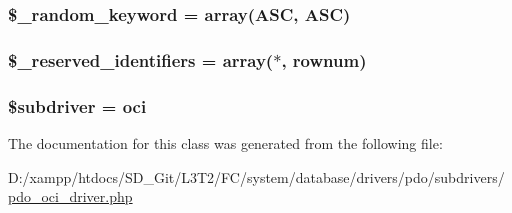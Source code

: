 \subsubsection[{\$\+\_\+random\+\_\+keyword}]{\setlength{\rightskip}{0pt plus 5cm}\$\+\_\+random\+\_\+keyword = array(\textquotesingle{}A\+S\+C\textquotesingle{}, \textquotesingle{}A\+S\+C\textquotesingle{})\hspace{0.3cm}{\ttfamily [protected]}}\label{class_c_i___d_b__pdo__oci__driver_a10213aa6e05f6d924d3277bb1d2fea00}
\hypertarget{class_c_i___d_b__pdo__oci__driver_aa3298c4c62fbee8bb09f1b75b633fb0d}{}
\subsubsection[{\$\+\_\+reserved\+\_\+identifiers}]{\setlength{\rightskip}{0pt plus 5cm}\$\+\_\+reserved\+\_\+identifiers = array(\textquotesingle{}$\ast$\textquotesingle{}, \textquotesingle{}rownum\textquotesingle{})\hspace{0.3cm}{\ttfamily [protected]}}\label{class_c_i___d_b__pdo__oci__driver_aa3298c4c62fbee8bb09f1b75b633fb0d}
\hypertarget{class_c_i___d_b__pdo__oci__driver_a1322ca756348b11d080cb7a4f590de15}{}
\subsubsection[{\$subdriver}]{\setlength{\rightskip}{0pt plus 5cm}\$subdriver = \textquotesingle{}oci\textquotesingle{}}\label{class_c_i___d_b__pdo__oci__driver_a1322ca756348b11d080cb7a4f590de15}


The documentation for this class was generated from the following file\+:\begin{DoxyCompactItemize}
\item 
D\+:/xampp/htdocs/\+S\+D\+\_\+\+Git/\+L3\+T2/\+F\+C/system/database/drivers/pdo/subdrivers/\hyperlink{pdo__oci__driver_8php}{pdo\+\_\+oci\+\_\+driver.\+php}\end{DoxyCompactItemize}
